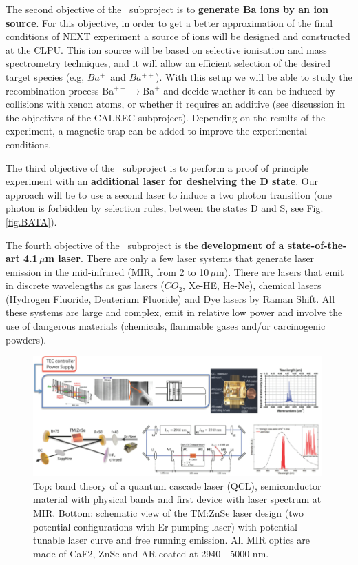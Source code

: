 The second objective of the \BATA\ subproject is to {\bf generate Ba ions by an ion source}. For this objective, in order to get a better approximation of the final conditions of NEXT experiment a source of ions will be designed and constructed at the CLPU. This ion source will be based on selective ionisation and mass spectrometry techniques, and it will allow an efficient selection of the desired target species (e.g, $Ba^{+}$~and $Ba^{++}$). With this setup we will be able to study the recombination process Ba$^{++}\rightarrow$Ba$^{+}$ and decide whether it can be induced by collisions with xenon atoms, or whether it requires an additive (see discussion in the objectives of the CALREC subproject). Depending on the results of the experiment, a magnetic trap can be added to improve the experimental conditions. 

The third objective of the \BATA\ subproject is to perform a proof of principle experiment with an {\bf additional laser for deshelving the D state}. Our approach will be to use a second laser to induce a two photon transition (one photon is forbidden by selection rules, between the states D and S, see Fig.\,\ref{fig.BATA}). 	

The fourth objective of the \BATA\ subproject is the {\bf development of a state-of-the-art 4.1\,$\mu$m laser}. There are only a few laser systems that generate laser emission in the mid-infrared (MIR, from 2 to 10\,$\mu$m). There are lasers that emit in discrete wavelengths as gas lasers ($CO_2$, Xe-HE, He-Ne), chemical lasers (Hydrogen Fluoride, Deuterium Fluoride) and Dye lasers by Raman Shift. All these systems are large and complex, emit in relative low power and involve the use of dangerous materials (chemicals, flammable gases and/or carcinogenic powders). 

\begin{figure}[h!]
\begin{center}
\includegraphics[width=0.99\textwidth]{img/MIR.png}
\end{center}
\caption{\label{Fig:MIR}\small Top: band theory of a quantum cascade laser (QCL), semiconductor material with physical bands and first device with laser spectrum at MIR. Bottom: schematic view of the TM:ZnSe laser design (two potential configurations with Er pumping laser) with potential tunable laser curve and free running emission. All MIR optics are made of CaF2, ZnSe and AR-coated at 2940 - 5000 nm.}
\end{figure}

